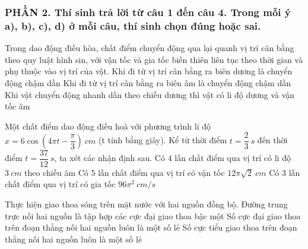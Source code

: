 \subsubsection*{PHẦN 2. Thí sinh trả lời từ câu 1 đến câu 4. Trong mỗi ý a), b), c), d) ở mỗi câu, thí sinh chọn đúng hoặc sai.}
\setcounter{ex}{0}
\begin{ex}
Trong dao động điều hòa, chất điểm chuyển động qua lại quanh vị trí cân bằng theo quy luật hình sin, với vận tốc và gia tốc biến thiên liên tục theo thời gian và phụ thuộc vào vị trí của vật. 
	{\True Khi đi từ vị trí cân bằng ra biên dương là chuyển động chậm dần}
	{\True Khi đi từ vị trí cân bằng ra biên âm là chuyển động chậm dần}
	{Khi vật chuyển động nhanh dần theo chiều dương thì vật có li độ dương và vận tốc âm} 
\end{ex}
\begin{ex}
	Một chất điểm dao động điều hoà với phương trình li độ $x=6 \cos \left(4 \pi t-\dfrac{\pi}{3}\right)\ cm$ (t tính bằng giây). Kể từ thời điểm $t=\dfrac{2}{3}\ s$ đến thời điểm $t=\dfrac{37}{12}\ s$, ta xét các nhận định sau.
	{Có $4$ lần chất điểm qua vị trí có li độ $3\ cm$ theo chiều âm}
	{Có $5$ lần chất điểm qua vị trí có vận tốc $12 \pi \sqrt{2}\ cm$}
	{Có $3$ lần chất điểm qua vị trí có gia tốc $96 \pi^2 \ cm/s$}
\end{ex}
\begin{ex}
	Thực hiện giao thoa sóng trên mặt nước với hai nguồn đồng bộ.
	{Đường trung trực nối hai nguồn là tập hợp các cực đại giao thoa bậc một}
	{\True Số cực đại giao thoa trên đoạn thẳng nối hai nguồn luôn là một số lẻ}
	{Số cực tiểu giao thoa trên đoạn thẳng nối hai nguồn luôn là một số lẻ}
\end{ex}

